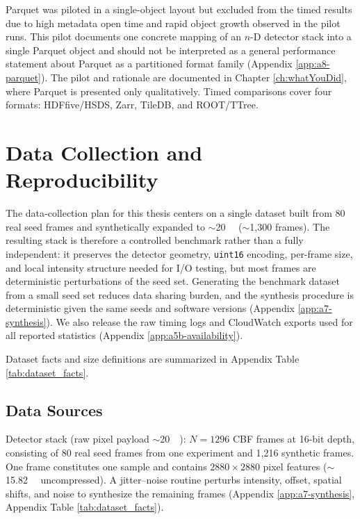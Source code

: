 \documentclass[nomenclature, english, bibtex]{kththesis}
\numberwithin{listing}{chapter}
\begin{document}
Parquet was piloted in a single-object layout but excluded from the timed results due to high metadata open time and rapid object growth observed in the pilot runs. This pilot documents one concrete mapping of an $n$-D detector stack into a single Parquet object and should not be interpreted as a general performance statement about Parquet as a partitioned format family (Appendix \ref{app:a8-parquet}). The pilot and rationale are documented in Chapter \ref{ch:whatYouDid}, where Parquet is presented only qualitatively. Timed comparisons cover four formats: \gls{HDFfive}/\gls{HSDS}, Zarr, TileDB, and \gls{ROOT}/\gls{TTree}.



\section{Data Collection and Reproducibility}
\label{sec:methods-data-reprod}
The data‐collection plan for this thesis centers on a single dataset built from 80 real seed frames and synthetically expanded to \(\sim\)\SI{20}{\gibi\byte} (\(\sim\)1{,}300 frames). The resulting stack is therefore a controlled benchmark rather than a fully independent: it preserves the detector geometry, \texttt{uint16} encoding, per-frame size, and local intensity structure needed for I/O testing, but most frames are deterministic perturbations of the seed set. Generating the benchmark dataset from a small seed set reduces data sharing burden, and the synthesis procedure is deterministic given the same seeds and software versions (Appendix \ref{app:a7-synthesis}). We also release the raw timing logs and CloudWatch exports used for all reported statistics (Appendix \ref{app:a5b-availability}).

Dataset facts and size definitions are summarized in Appendix Table \ref{tab:dataset_facts}.

\subsection{Data Sources}
Detector stack (raw pixel payload $\sim$\SI{20}{\gibi\byte}): $N{=}1296$ \gls{CBF} frames at 16-bit depth, consisting of 80 real seed frames from one experiment and 1{,}216 synthetic frames. One frame constitutes one sample and contains $2880\times2880$ pixel features (\(\sim\)\SI{15.82}{\mebi\byte} uncompressed). A jitter--noise routine perturbs intensity, offset, spatial shifts, and noise to synthesize the remaining frames (Appendix \ref{app:a7-synthesis}, Appendix Table \ref{tab:dataset_facts}).
\end{document}
